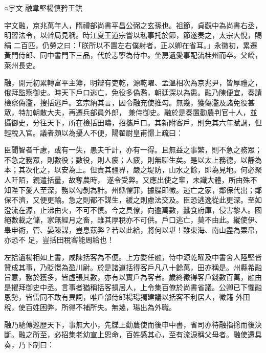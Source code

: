 
\begin{pinyinscope}

 ○宇文
 融韋堅楊慎矜王鉷



 宇文融，京兆萬年人，隋禮部尚書平昌公弼之玄孫也。祖節，貞觀中為尚書右丞，明習法令，以幹局見稱。時江夏王道宗嘗以私事托於節，節遂奏之，太宗大悅，賜絹
 二百匹，仍勞之曰：「朕所以不置左右僕射者，正以卿在省耳。」永徽初，累遷黃門侍郎、同中書門下三品，代於志寧為侍中。坐房遺愛事配流桂州而卒。父嶠，萊州長史。



 融，開元初累轉富平主簿，明辯有吏乾，源乾曜、孟溫相次為京兆尹，皆厚禮之，俄拜監察御史。時天下戶口逃亡，免役多偽濫，朝廷深以為患。融乃陳便宜，奏請檢察偽濫，搜括逃戶。玄宗納其言，因令融充使推勾。無幾，獲偽濫及諸免役甚眾，特加朝散大夫，再遷兵部員外郎，
 兼侍御史。融於是奏置勸農判官十人，並攝御史，分往天下，所在檢括田疇，招攜戶口。其新附客戶，則免其六年賦調，但輕稅入官。議者頗以為擾人不便，陽翟尉皇甫憬上疏曰：



 臣聞智者千慮，或有一失，愚夫千計，亦有一得。且無益之事繁，則不急之務眾；不急之務眾，則數役；數役，則人疲；人疲，則無聊生矣。是以太上務德，以靜為本；其次化之，以安為上。但責其疆界，嚴之堤防，山水之餘，即為見地。何必聚人阡陌，親遣括量，故奪農時，
 遂令受弊。又應出使之輩，未識大體，所由殊不知陛下愛人至深，務以勾剝為計。州縣懼罪，據牒即徵。逃亡之家，鄰保代出；鄰保不濟，又便更輸。急之則都不謀生，緩之則慮法交及。臣恐逃逸從此更深。至如澄流在源，止沸由火，不可不慎。今之具僚，向逾萬數，蠶食府庫，侵害黎人。國絕數載之儲，家無經月之畜，雖其厚稅亦不可供。戶口逃亡，莫不由此。縱使伊、皋申術，管、晏陳謀，豈息茲弊？若以此給，將何以堪！雖東海、南山盡為粟帛，亦恐不
 足，豈括田稅客能周給也！



 左拾遺楊相如上書，咸陳括客為不便。上方委任融，侍中源乾曜及中書舍人陸堅皆贊成其事，乃貶憬為盈川尉。於是諸道括得客戶凡八十餘萬，田亦稱是。州縣希融旨意，務於獲多，皆虛張其數，亦有以實戶為客者。歲終徵得客戶錢數百萬，融由是擢拜御史中丞。言事者猶稱括客損居人，上令集百僚於尚書省議。公卿已下懼融恩勢，皆雷同不敢有異詞，唯戶部侍郎楊瑒獨建議以括客不利居人，徵籍
 外田稅，使百姓困弊，所得不補所失。無幾，瑒出為外職。



 融乃馳傳巡歷天下，事無大小，先牒上勸農使而後申中書，省司亦待融指捴而後決斷。融之所至，必招集老幼宣上恩命，百姓感其心，至有流淚稱父母者。融使還具奏，乃下制曰：




\end{pinyinscope}
